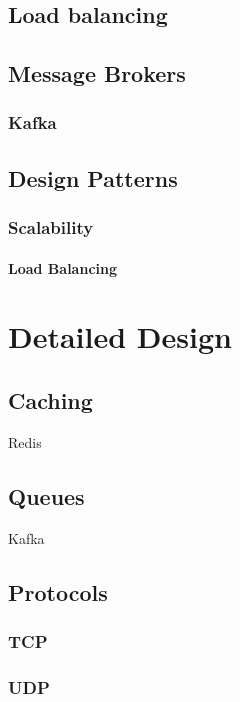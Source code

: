 \documentclass[a4paper, 11pt]{book}
\begin{document}
    \subsection{Load balancing}

    \subsection{Message Brokers}

    \subsubsection{Kafka}

    \subsection{Design Patterns}

    \subsubsection{Scalability}

    \paragraph{Load Balancing}
    
    \section{Detailed Design}

    \subsection{Caching}
    Redis

    \subsection{Queues}
    Kafka

    \subsection{Protocols}

    \subsubsection{TCP}

    \subsubsection{UDP}
\end{document}
